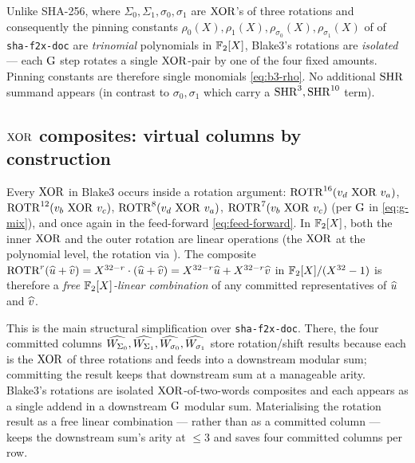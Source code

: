 \begin{remark}\label{rem:b3-monomial}
Unlike SHA-256, where $\Sigma_0, \Sigma_1, \sigma_0, \sigma_1$ are
$\operatorname{XOR}$'s of three rotations and consequently the pinning constants
$\rho_0(X), \rho_1(X), \rho_{\sigma_0}(X), \rho_{\sigma_1}(X)$ of
 of \texttt{sha-f2x-doc} are
\emph{trinomial} polynomials in $\mathbb{F}_2[X]$, Blake3's rotations are
\emph{isolated} — each $\operatorname{G}$ step rotates a single $\operatorname{XOR}$-pair by
one of the four fixed amounts. Pinning constants are therefore single
monomials \eqref{eq:b3-rho}. No additional $\operatorname{SHR}$ summand appears (in
contrast to $\sigma_0, \sigma_1$ which carry a $\operatorname{SHR}^3, \operatorname{SHR}^{10}$
term).
\end{remark}

\subsection{$\operatorname{XOR}$ composites: virtual columns by construction}
\label{sec:b3-virtual}

Every $\operatorname{XOR}$ in Blake3 occurs inside a rotation argument:
$\operatorname{ROTR}^{16}(v_d \,\operatorname{XOR}\, v_a)$,
$\operatorname{ROTR}^{12}(v_b \,\operatorname{XOR}\, v_c)$,
$\operatorname{ROTR}^{8}(v_d \,\operatorname{XOR}\, v_a)$,
$\operatorname{ROTR}^{7}(v_b \,\operatorname{XOR}\, v_c)$
(per $\operatorname{G}$ in \eqref{eq:g-mix}), and once again in the feed-forward
\eqref{eq:feed-forward}. In $\mathbb{F}_2[X]$, both the inner $\operatorname{XOR}$ and the
outer rotation are linear operations (the $\operatorname{XOR}$ at the polynomial
level, the rotation via ). The composite
$\operatorname{ROTR}^{r}(\widehat{u} + \widehat{v}) = X^{32-r}\cdot (\widehat{u} + \widehat{v}) =
X^{32-r}\widehat{u} + X^{32-r}\widehat{v}$ in $\mathbb{F}_2[X]/(X^{32}-1)$ is therefore a
\emph{free $\mathbb{F}_2[X]$-linear combination} of any committed
representatives of $\widehat{u}$ and $\widehat{v}$.

\begin{remark}\label{rem:no-rot-cols}
This is the main structural simplification over
\texttt{sha-f2x-doc}. There, the four committed columns
$\widehat{W_{\Sigma_0}}, \widehat{W_{\Sigma_1}}, \widehat{W_{\sigma_0}},
\widehat{W_{\sigma_1}}$ store rotation/shift results because each is the
$\operatorname{XOR}$ of three rotations and feeds into a downstream modular sum;
committing the result keeps that downstream sum at a manageable
arity. Blake3's rotations are isolated $\operatorname{XOR}$-of-two-words composites
and each appears as a single addend in a downstream $\operatorname{G}$ modular
sum. Materialising the rotation result as a free linear
combination — rather than as a committed column — keeps the
downstream sum's arity at $\le 3$ and saves four committed columns
per row.
\end{remark}

